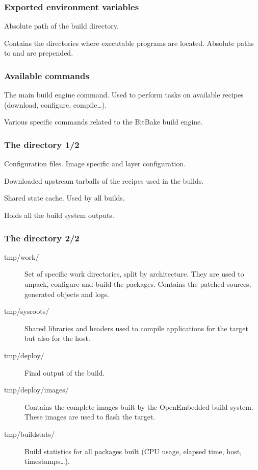 \begin{frame}
  \frametitle{Exported environment variables}
  \begin{description}[style=nextline]
    \item[BUILDDIR] Absolute path of the build directory.
    \item[PATH] Contains the directories where executable programs are
      located. Absolute paths to  and
       are prepended.
  \end{description}
\end{frame}

\begin{frame}
  \frametitle{Available commands}
  \begin{description}[style=nextline]
    \item[bitbake] The main build engine command. Used to perform
      tasks on available recipes (download, configure, compile\dots).
    \item[bitbake-*] Various specific commands related to the BitBake
      build engine.
  \end{description}
\end{frame}

\begin{frame}
  \frametitle{The  directory 1/2}
  \begin{description}[style=nextline]
    \item[conf/] Configuration files. Image specific and layer
      configuration.
    \item[downloads/] Downloaded upstream tarballs of the recipes
      used in the builds.
    \item[sstate-cache/] Shared state cache. Used by all builds.
    \item[tmp/] Holds all the build system outputs.
  \end{description}
\end{frame}

\begin{frame}
  \frametitle{The  directory 2/2}
  \begin{description}
    \item[tmp/work/] Set of specific work directories, split by
      architecture. They are used to unpack, configure and build the
      packages. Contains the patched sources, generated objects and
      logs.
    \item[tmp/sysroots/] Shared libraries and headers used to compile
      applications for the target but also for the host.
    \item[tmp/deploy/] Final output of the build.
    \item[tmp/deploy/images/] Contains the complete images built by
      the OpenEmbedded build system. These images are used to flash
      the target.
    \item[tmp/buildstats/] Build statistics for all packages built
      (CPU usage, elapsed time, host, timestamps\dots).
  \end{description}
\end{frame}

